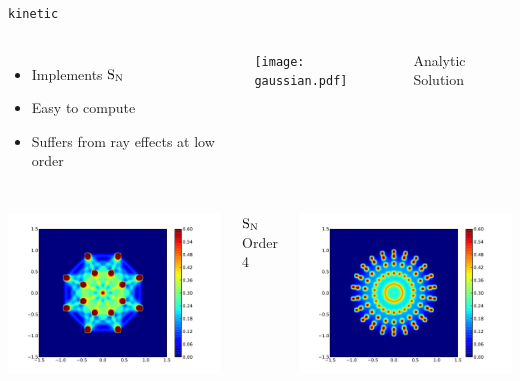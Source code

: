 \documentclass{beamer}
\newcommand{\SN}{\ensuremath{\textnormal{S}_\textnormal{N}}\xspace}
\newcommand{\kinetic}{\texttt{kinetic}\xspace}
\begin{document}
    \begin{frame}{\kinetic}
        \begin{columns}
            \begin{itemize}
                \item Implements \SN
                \item Easy to compute
                \item Suffers from ray effects at low order
            \end{itemize}

            \centering
            \texttt{[image: gaussian.pdf]}

            Analytic Solution
        \end{columns}

        \vfill

        \begin{columns}
            \centering
            \includegraphics[width=\textwidth]{S04-400.pdf}

            \SN Order 4

            \centering
            \includegraphics[width=\textwidth]{S11-400.pdf}


\end{columns}
\end{frame}
\end{document}

